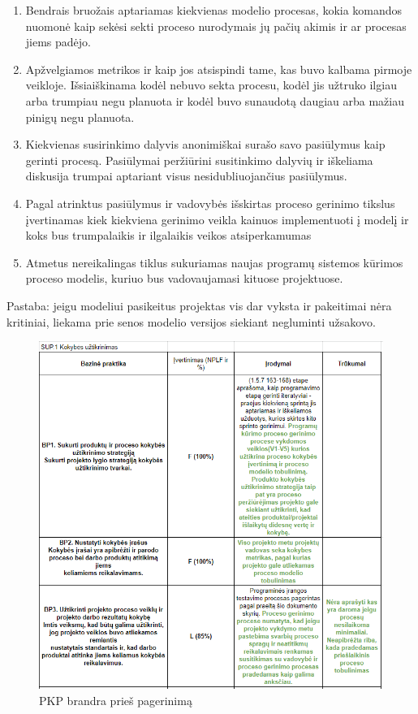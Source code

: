 \documentclass{VUMIFPSkursinis}
\begin{document}
	\begin{enumerate}
		\item{Bendrais bruožais aptariamas kiekvienas modelio procesas, kokia komandos nuomonė kaip sekėsi sekti proceso nurodymais jų pačių akimis ir ar procesas jiems padėjo.}
		\item{Apžvelgiamos metrikos ir kaip jos atsispindi tame, kas buvo kalbama pirmoje veikloje. 
			Išsiaiškinama kodėl nebuvo sekta procesu, kodėl jis užtruko ilgiau arba trumpiau negu planuota ir kodėl buvo sunaudotą daugiau arba mažiau pinigų negu planuota.}
		\item{Kiekvienas susirinkimo dalyvis anonimiškai surašo savo pasiūlymus kaip gerinti procesą.
			Pasiūlymai peržiūrini susitinkimo dalyvių ir iškeliama diskusija trumpai aptariant visus nesidubliuojančius pasiūlymus.}
		\item{Pagal atrinktus pasiūlymus ir vadovybės išskirtas proceso gerinimo tikslus įvertinamas kiek kiekviena gerinimo veikla kainuos implementuoti į modelį ir koks bus trumpalaikis ir ilgalaikis veikos atsiperkamumas}
		\item{Atmetus nereikalingas tiklus sukuriamas naujas programų sistemos kūrimos proceso modelis, kuriuo bus vadovaujamasi kituose projektuose.}
	\end{enumerate}

	Pastaba: jeigu modeliui pasikeitus projektas vis dar vyksta ir pakeitimai nėra kritiniai, liekama prie senos modelio versijos siekiant negluminti užsakovo.	

	\begin{figure}[htbp]
		\includegraphics[scale=0.9]{img/sup1one}
		\caption{PKP brandra prieš pagerinimą} %
		\label{img:pkpPries}
	\end{figure}	
\end{document}

